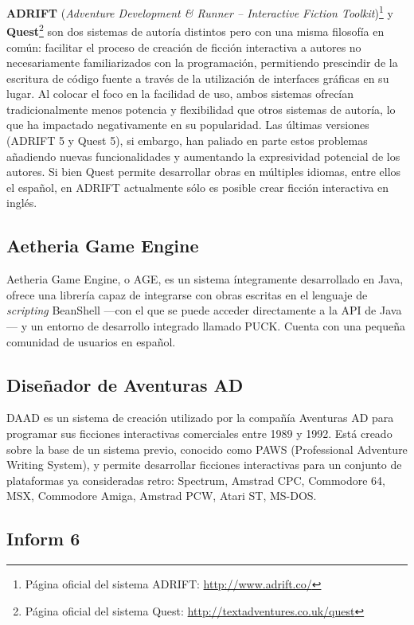 \textbf{ADRIFT} (\emph{Adventure Development \& Runner -- Interactive Fiction Toolkit})\footnote{Página oficial del sistema ADRIFT: \url{http://www.adrift.co/}} y \textbf{Quest}\footnote{Página oficial del sistema Quest: \url{http://textadventures.co.uk/quest}} son dos sistemas de autoría distintos pero con una misma filosofía en común: facilitar el proceso de creación de ficción interactiva a autores no necesariamente familiarizados con la programación, permitiendo prescindir de la escritura de código fuente a través de la utilización de interfaces gráficas en su lugar. Al colocar el foco en la facilidad de uso, ambos sistemas ofrecían tradicionalmente menos potencia y flexibilidad que otros sistemas de autoría, lo que ha impactado negativamente en su popularidad. Las últimas versiones (ADRIFT 5 y Quest 5), si embargo, han paliado en parte estos problemas añadiendo nuevas funcionalidades y aumentando la expresividad potencial de los autores. Si bien Quest permite desarrollar obras en múltiples idiomas, entre ellos el español, en ADRIFT actualmente sólo es posible crear ficción interactiva en inglés.

\subsection{Aetheria Game Engine}

Aetheria Game Engine, o AGE, es un sistema íntegramente desarrollado en Java, ofrece una librería capaz de integrarse con obras escritas en el lenguaje de \emph{scripting} BeanShell ---con el que se puede acceder directamente a la API de Java--- y un entorno de desarrollo integrado llamado PUCK. Cuenta con una pequeña comunidad de usuarios en español.

\subsection{Diseñador de Aventuras AD}

DAAD es un sistema de creación utilizado por la compañía Aventuras AD para programar sus ficciones interactivas comerciales entre 1989 y 1992. Está creado sobre la base de un sistema previo, conocido como PAWS (Professional Adventure Writing System), y permite desarrollar ficciones interactivas para un conjunto de plataformas ya consideradas retro: Spectrum, Amstrad CPC, Commodore 64, MSX, Commodore Amiga, Amstrad PCW, Atari ST, MS-DOS.

\subsection{Inform 6}


